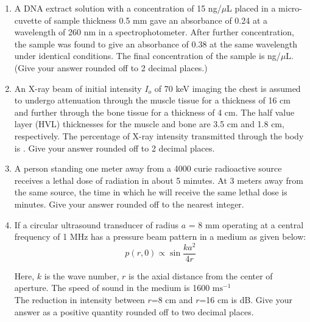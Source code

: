 \documentclass[a4paper,12pt]{exam}
\numberwithin{equation}{enumi}
\numberwithin{figure}{enumi}
\begin{document}
\begin{enumerate}
\hfill{}

\item A DNA extract solution with a concentration of 15 ng/$\mu$L placed in a micro-cuvette of sample thickness 0.5 mm gave an absorbance of 0.24 at a wavelength of 260 nm in a 
spectrophotometer. After further concentration, the sample was found to give an absorbance of 0.38 at the same wavelength under identical conditions. The final 
concentration of the sample is \underline{\hspace{1cm}} ng/$\mu$L. (Give your answer rounded off to 2 
decimal places.)

\hfill{}

\item An X-ray beam of initial intensity $I_o$ of 70 keV imaging the chest is assumed to undergo 
attenuation through the muscle tissue for a thickness of 16 cm and further through the 
bone tissue for a thickness of 4 cm. The half value layer (HVL) thicknesses for the 
muscle and bone are 3.5 cm and 1.8 cm, respectively. The percentage of X-ray 
intensity transmitted through the body is \underline{\hspace{1cm}}. Give your answer rounded off to 2 
decimal places.

\hfill{}

\item A person standing one meter away from a 4000 curie radioactive source receives a  
lethal dose of radiation in about 5 minutes. At 3 meters away from the same source, 
the time in which he will receive the same lethal dose is \underline{\hspace{1cm}}minutes. Give your 
answer rounded off to the nearest integer.

\hfill{}

\item If a circular ultrasound transducer of radius $a$ = 8 mm operating at a central frequency 
of 1 MHz has a pressure beam pattern in a medium as given below: \\[8pt]
\begin{equation*}\displaystyle p(r, 0)\propto \sin \frac{ka^2}{4r}
\end{equation*}

Here, $k$ is the wave number, $r$ is the axial distance from the center of aperture. The 
speed of sound in the medium is 1600 m$\text{s}^{-1}$ \\[8pt] The reduction in intensity between $r$=8 cm and $r$=16 cm is \underline{\hspace{1cm}} dB. Give your  
answer as a positive quantity rounded off to two decimal places.


\end{enumerate}
\end{document}
